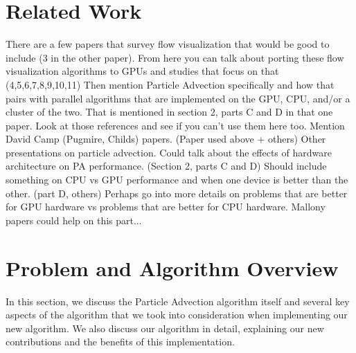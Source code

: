 \documentclass{IEEEtran}
\begin{document}
\section{Related Work}
There are a few papers that survey flow visualization that would be good to include (3 in the other paper).
%
From here you can talk about porting these flow visualization algorithms to GPUs and studies that focus on that (4,5,6,7,8,9,10,11)
%
Then mention Particle Advection specifically and how that pairs with parallel algorithms that are implemented on the GPU, CPU, and/or a cluster of the two.
%
That is mentioned in section 2, parts C and D in that one paper.
%
Look at those references and see if you can't use them here too.
%
Mention David Camp (Pugmire, Childs) papers. (Paper used above + others)
%
Other presentations on particle advection.
%
Could talk about the effects of hardware architecture on PA performance. (Section 2, parts C and D)
%
Should include something on CPU vs GPU performance and when one device is better than the other. (part D, others)
%
Perhaps go into more details on problems that are better for GPU hardware vs problems that are better for CPU hardware.
%
Mallony papers could help on this part...
%
\section{Problem and Algorithm Overview}
In this section, we discuss the Particle Advection algorithm itself and several key aspects of the algorithm that we took into consideration when implementing our new algorithm. 
%
We also discuss our algorithm in detail, explaining our new contributions and the benefits of this implementation.
%
\end{document}

